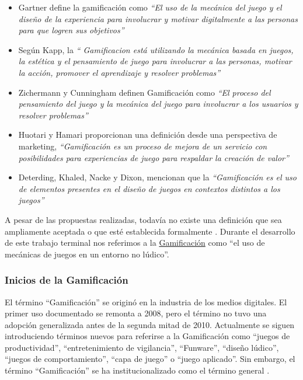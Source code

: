    \begin{itemize}

        \item Gartner define la gamificación como {\it ``El uso de la mecánica del juego y 
        el diseño de la experiencia para involucrar y motivar digitalmente a las personas para 
        que logren sus objetivos''} \cite{Burke}
        
        \item Según Kapp, la {\it`` Gamificacion está utilizando la mecánica basada en juegos, 
        la estética y el pensamiento de juego para involucrar a las personas, motivar la acción, 
        promover el aprendizaje y resolver problemas''} \cite{Kapp} %
        
        \item Zichermann y Cunningham definen Gamificación como {\it ``El proceso del 
        pensamiento del juego y la mecánica del juego para involucrar a los usuarios y resolver 
        problemas''} \cite{GamByDesign} %
        
        \item Huotari y Hamari proporcionan una definición desde una perspectiva de marketing,
        {\it ``Gamificación es un proceso de mejora de un servicio con posibilidades para 
        experiencias de juego para respaldar la creación de valor''} \cite{Huotari}  %
        
        \item Deterding, Khaled, Nacke y Dixon, mencionan que la {\it ``Gamificación
        es el uso de elementos presentes en el diseño de juegos en contextos distintos a
        los juegos''} \cite{DeterdingDefinition} %
    
    \end{itemize}

\noindent A pesar de las propuestas realizadas, todavía no existe una definición que sea ampliamente aceptada o que esté establecida formalmente \cite{Seaborn}. Durante el desarrollo de este trabajo terminal nos referimos a la \hyperlink{tGamificacion}{Gamificación} como ``el uso de mecánicas de juegos en un entorno no lúdico''.


\subsubsection{Inicios de la Gamificación}

El término ``Gamificación'' se originó en la industria de los medios digitales. El primer uso documentado se remonta a 2008, pero el término no tuvo una adopción generalizada antes de la segunda mitad de 2010. Actualmente se siguen introduciendo términos nuevos para referirse a la Gamificación como ``juegos de productividad'', ``entretenimiento de vigilancia'', ``Funware'', ``diseño lúdico'', ``juegos de comportamiento'', ``capa de juego'' o ``juego aplicado''. Sin embargo, el término ``Gamificación'' se ha institucionalizado como el término general \cite{DeterdingGamefulness}.\\
    
